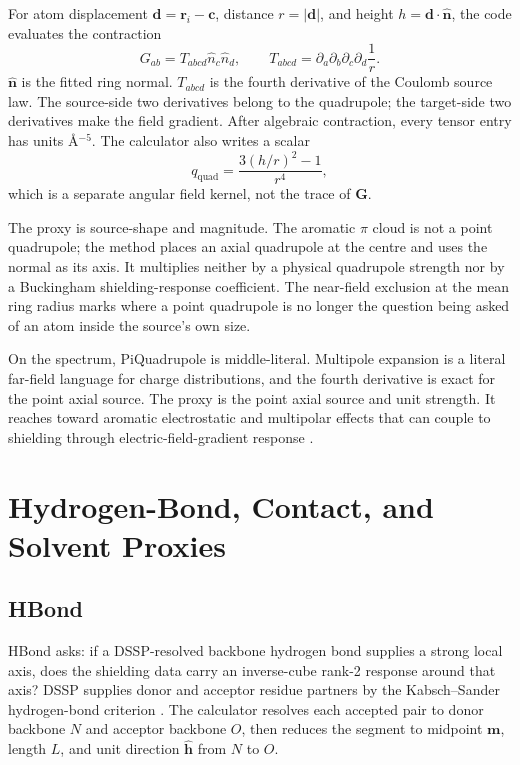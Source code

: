 \documentclass[11pt]{article}
\begin{document}
For atom displacement \(\bm d=\bm r_i-\bm c\), distance \(r=|\bm d|\), and
height \(h=\bm d\cdot\hat{\bm n}\), the code evaluates the contraction
\[
  G_{ab}=T_{abcd}\hat n_c\hat n_d,
  \qquad
  T_{abcd}=
  \partial_a\partial_b\partial_c\partial_d\frac{1}{r}.
\]
\(\hat{\bm n}\) is the fitted ring normal. \(T_{abcd}\) is the fourth
derivative of the Coulomb source law. The source-side two derivatives belong
to the quadrupole; the target-side two derivatives make the field gradient.
After algebraic contraction, every tensor entry has units
\(\si{\angstrom^{-5}}\). The calculator also writes a scalar
\[
  q_{\mathrm{quad}}=\frac{3(h/r)^2-1}{r^4},
\]
which is a separate angular field kernel, not the trace of \(\bm G\).

The proxy is source-shape and magnitude. The aromatic \(\pi\) cloud is not a
point quadrupole; the method places an axial quadrupole at the centre and uses
the normal as its axis. It multiplies neither by a physical quadrupole strength
nor by a Buckingham shielding-response coefficient. The near-field exclusion at
the mean ring radius marks where a point quadrupole is no longer the question
being asked of an atom inside the source's own size.

On the spectrum, PiQuadrupole is middle-literal. Multipole expansion is a
literal far-field language for charge distributions, and the fourth derivative
is exact for the point axial source. The proxy is the point axial source and
unit strength. It reaches toward aromatic electrostatic and multipolar effects
that can couple to shielding through electric-field-gradient response
\cite{buckingham1960,kjaer2011}.

\section{Hydrogen-Bond, Contact, and Solvent Proxies}

\subsection{HBond}

HBond asks: if a DSSP-resolved backbone hydrogen bond supplies a strong local
axis, does the shielding data carry an inverse-cube rank-2 response around that
axis? DSSP supplies donor and acceptor residue partners by the Kabsch--Sander
hydrogen-bond criterion \cite{kabsch1983}. The calculator resolves each
accepted pair to donor backbone \(N\) and acceptor backbone \(O\), then reduces
the segment to midpoint \(\bm m\), length \(L\), and unit direction
\(\hat{\bm h}\) from \(N\) to \(O\).
\end{document}
